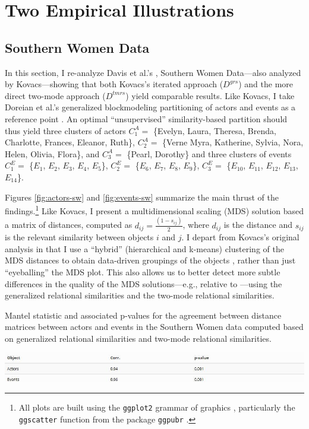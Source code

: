 \documentclass[a4paper,fleqn]{cas-sc}
\begin{document}
\section{Two Empirical Illustrations}
\subsection{Southern Women Data}
In this section, I re-analyze Davis et al.'s \citeyearpar{davis1941}, Southern Women Data---also analyzed by Kovacs---showing that both Kovacs's iterated approach ($D^{grs}$) and the more direct two-mode approach ($D^{tmrs}$) yield comparable results. Like Kovacs, I take Doreian et al.'s generalized blockmodeling partitioning of actors and events as a reference point \citeyearpar[Table 4]{doreian2004}. An optimal ``unsupervised'' similarity-based partition should thus yield three clusters of actors $C_1^A =$ \{Evelyn, Laura, Theresa, Brenda, Charlotte, Frances, Eleanor, Ruth\}, $C_2^A=$ \{Verne Myra, Katherine, Sylvia, Nora, Helen, Olivia, Flora\}, and $C_3^A=$ \{Pearl, Dorothy\} and three clusters of events $C_1^E=$ \{$E_1$, $E_2$, $E_3$, $E_4$, $E_5$\}, $C_2^E=$ \{$E_6$, $E_7$, $E_8$, $E_9$\}, $C_3^E=$ \{$E_{10}$, $E_{11}$, $E_{12}$, $E_{13}$, $E_{14}$\}. 

Figures \ref{fig:actors-sw} and \ref{fig:events-sw} summarize the main thrust of the findings.\footnote{All plots are built using the \texttt{ggplot2} grammar of graphics \citep{wickham16}, particularly the \texttt{ggscatter} function from the package \texttt{ggpubr} \citep{kassambara}.} Like Kovacs, I present a multidimensional scaling (MDS) solution based a matrix of distances, computed as $d_{ij} = \frac{(1-s_{ij})}{2}$, where $d_{ij}$ is the distance and $s_{ij}$ is the relevant similarity between objects $i$ and $j$. I depart from Kovacs's original analysis in that I use a ``hybrid'' (hierarchical and k-means) clustering of the MDS distances to obtain data-driven groupings of the objects \citep{chen2005novel}, rather than just ``eyeballing'' the MDS plot. This also allows us to better detect more subtle differences in the quality of the MDS solutions---e.g., relative to \citet{doreian2004}---using the generalized relational similarities and the two-mode relational similarities. 

\begin{table}[ht!]
    \caption{Mantel statistic and associated p-values for the agreement between distance matrices between actors and events in the Southern Women data computed based on generalized relational similarities and two-mode relational similarities.}
    \centering
    \includegraphics[width=1.0\textwidth]{Tabs/corr-tab-sw.jpg}
    \label{tab:mantel-sw}
\end{table}
  
\end{document}

